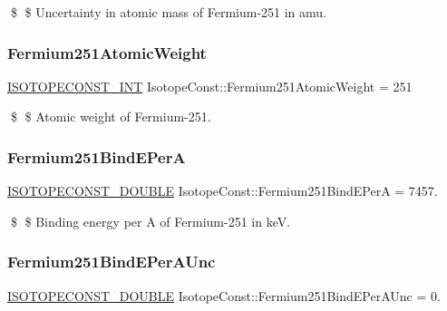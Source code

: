 \$ \$ Uncertainty in atomic mass of Fermium-\/251 in amu. \mbox{\label{group___isotope_const-_fermium-_fm251_ga74b66d4b6d22b9d503c53cff97e39a68}} 
\subsubsection{\texorpdfstring{Fermium251\+Atomic\+Weight}{Fermium251AtomicWeight}}
{\footnotesize\ttfamily \mbox{\hyperlink{group___isotope_const-_macros_ga5f18360b3e99483a35c32d789e62621c}{I\+S\+O\+T\+O\+P\+E\+C\+O\+N\+S\+T\+\_\+\+I\+NT}} Isotope\+Const\+::\+Fermium251\+Atomic\+Weight = 251}

\$ \$ Atomic weight of Fermium-\/251. \mbox{\label{group___isotope_const-_fermium-_fm251_ga36d28875be47a58300e3ff0a767db71b}} 
\subsubsection{\texorpdfstring{Fermium251\+Bind\+E\+PerA}{Fermium251BindEPerA}}
{\footnotesize\ttfamily \mbox{\hyperlink{group___isotope_const-_macros_ga8f45a7272ce02c0b4c65c44636ed719a}{I\+S\+O\+T\+O\+P\+E\+C\+O\+N\+S\+T\+\_\+\+D\+O\+U\+B\+LE}} Isotope\+Const\+::\+Fermium251\+Bind\+E\+PerA = 7457.}

\$ \$ Binding energy per A of Fermium-\/251 in keV. \mbox{\label{group___isotope_const-_fermium-_fm251_ga928924e51872e099977a25f606ba17cb}} 
\subsubsection{\texorpdfstring{Fermium251\+Bind\+E\+Per\+A\+Unc}{Fermium251BindEPerAUnc}}
{\footnotesize\ttfamily \mbox{\hyperlink{group___isotope_const-_macros_ga8f45a7272ce02c0b4c65c44636ed719a}{I\+S\+O\+T\+O\+P\+E\+C\+O\+N\+S\+T\+\_\+\+D\+O\+U\+B\+LE}} Isotope\+Const\+::\+Fermium251\+Bind\+E\+Per\+A\+Unc = 0.}

